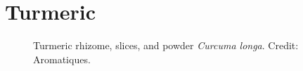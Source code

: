 \section{Turmeric}
\label{sec:turmeric}



\begin{figure}[!ht]
	\vspace{-4ex}
	\centering
	\hfill
	\hfill
	\caption[Turmeric in various forms.]{Turmeric rhizome, slices, and powder \textit{Curcuma longa}. Credit: Aromatiques.}
	\label{fig:turmeric_imgs}
\end{figure}

